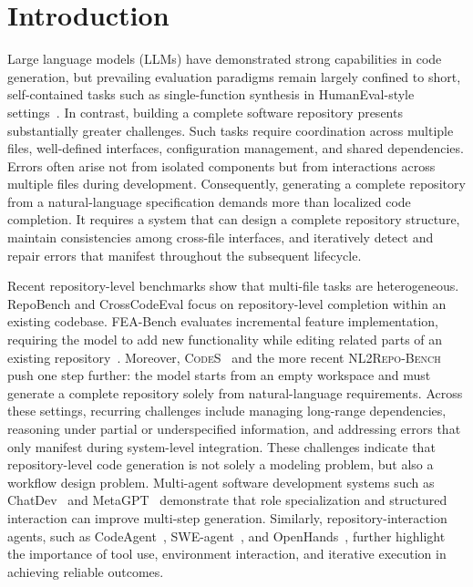 \documentclass[format=acmsmall, review=false, screen=true]{acmart}
\newcommand{\codes}{\textsc{CodeS}\xspace}
\newcommand{\nlrepobench}{\textsc{NL2Repo-Bench}\xspace}
\begin{document}
\section{Introduction}
Large language models (LLMs) have demonstrated strong capabilities in code generation, but prevailing evaluation paradigms remain largely confined to short, self-contained tasks such as single-function synthesis in HumanEval-style settings~\cite{Chen2021Codex}. In contrast, building a complete software repository presents substantially greater challenges. Such tasks require coordination across multiple files, well-defined interfaces, configuration management, and shared dependencies. Errors often arise not from isolated components but from interactions across multiple files during development. Consequently, generating a complete repository from a natural-language specification demands more than localized code completion. It requires a system that can design a complete repository structure, maintain consistencies among cross-file interfaces, and iteratively detect and repair errors that manifest throughout the subsequent lifecycle.

Recent repository-level benchmarks show that multi-file tasks are heterogeneous. RepoBench \cite{Liu2023RepoBench} and CrossCodeEval \cite{Ding2023CrossCodeEval} focus on repository-level completion within an existing codebase. FEA-Bench evaluates incremental feature implementation, requiring the model to add new functionality while editing related parts of an existing repository~\cite{Li2025FEABench}. Moreover, \codes ~\cite{Zan2025CodeS} and the more recent \nlrepobench \cite{Ding2025NL2RepoBench} push one step further: the model starts from an empty workspace and must generate a complete repository solely from natural-language requirements. Across these settings, recurring challenges include managing long-range dependencies, reasoning under partial or underspecified information, and addressing errors that only manifest during system-level integration. These challenges indicate that repository-level code generation is not solely a modeling problem, but also a workflow design problem. Multi-agent software development systems such as ChatDev~\cite{Qian2023ChatDev} and MetaGPT~\cite{Hong2023MetaGPT} demonstrate that role specialization and structured interaction can improve multi-step generation. Similarly, repository-interaction agents, such as CodeAgent~\cite{Zhang2024CodeAgent}, SWE-agent~\cite{Yang2024SWEagent}, and OpenHands~\cite{Wang2024OpenDevin}, further highlight the importance of tool use, environment interaction, and iterative execution in achieving reliable outcomes. 
\end{document}
